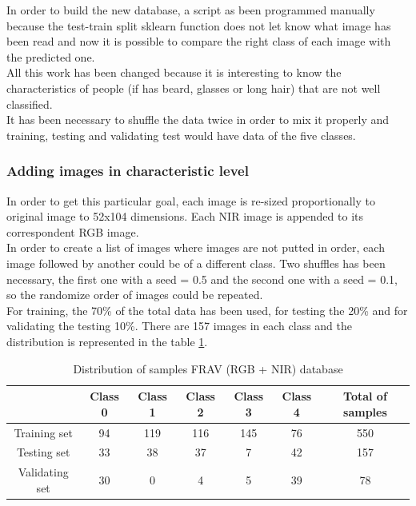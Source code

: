 In order to build the new database, a script as been programmed manually because the test-train split sklearn function does not let know what image has been read and now it is possible to compare the right class of each image with the predicted one.\\

All this work has been changed because it is interesting to know the characteristics of people (if has beard, glasses or long hair) that are not well classified.\\

It has been necessary to shuffle the data twice in order to mix it properly and training, testing and validating test would have data of the five classes.\\

\subsubsection{Adding images in characteristic level}
In order to get this particular goal, each image is re-sized proportionally to original image to 52x104 dimensions. Each NIR image is appended to its correspondent RGB image.\\

In order to create a list of images where images are not putted in order, each image followed by another could be of a different class. Two shuffles has been necessary, the first one with a seed = 0.5 and the second one with a seed = 0.1, so the randomize order of images could be repeated.\\

For training, the 70\% of the total data has been used, for testing the 20\% and for validating the testing 10\%. There are 157 images in each class and the distribution is represented in the table \ref{FRAV_distribution1}.\\

\begin{table}[htb]
\centering
\label{FRAV_distribution1}
\begin{tabular}{c|ccccc|c|}
\cline{2-7}
                                     & \multicolumn{1}{c|}{Class 0} & \multicolumn{1}{c|}{Class 1} & \multicolumn{1}{c|}{Class 2} & \multicolumn{1}{c|}{Class 3} & Class 4 & Total of samples \\ \hline
\multicolumn{1}{|c|}{Training set}  & 94                           & 119                          & 116                          & 145                          & 76      & 550              \\ \cline{1-1}
\multicolumn{1}{|c|}{Testing set}    & 33                           & 38                           & 37                           & 7                            & 42      & 157              \\ \cline{1-1}
\multicolumn{1}{|c|}{Validating set} & 30                           & 0                            & 4                            & 5                            & 39      & 78               \\ \hline
\end{tabular} \caption{Distribution of samples FRAV (RGB + NIR) database}

\end{table}

